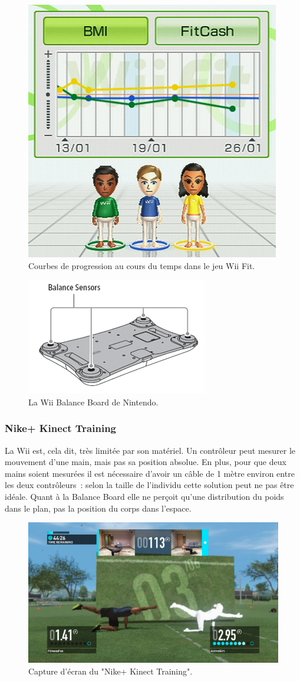\begin{figure}[h!]
\centering
\includegraphics[width=0.5\linewidth]{images/wii_fit}
\caption{Courbes de progression au cours du temps dans le jeu Wii Fit.}
\label{fig:wii_fit}
\end{figure}

\begin{figure}[h!]
\centering
\includegraphics[width=0.5\linewidth]{images/balance_board}
\caption{La Wii Balance Board de Nintendo.}
\label{fig:balance_board}
\end{figure}

\subsubsection{Nike+ Kinect Training}

La Wii est, cela dit, très limitée par son matériel. Un contrôleur peut mesurer
le mouvement d'une main, mais pas sa position absolue. En plus, pour que deux 
mains soient
mesurées il est nécessaire d'avoir un câble de 1 mètre environ entre les deux
contrôleurs~: selon la taille de l'individu cette solution peut ne pas être
idéale. Quant à la Balance Board elle ne perçoit qu'une distribution du poids dans 
le plan, pas la position du corps dans l'espace.

\begin{figure}[h!]
\centering
\includegraphics[width=0.8\linewidth]{images/nike_kinect}
\caption{Capture d'écran du "Nike+ Kinect Training".}
\end{figure}

